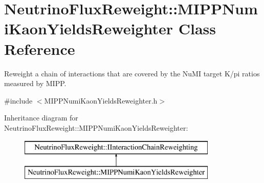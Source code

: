 \hypertarget{class_neutrino_flux_reweight_1_1_m_i_p_p_numi_kaon_yields_reweighter}{\section{Neutrino\-Flux\-Reweight\-:\-:M\-I\-P\-P\-Numi\-Kaon\-Yields\-Reweighter Class Reference}
\label{class_neutrino_flux_reweight_1_1_m_i_p_p_numi_kaon_yields_reweighter}
}


Reweight a chain of interactions that are covered by the Nu\-M\-I target K/pi ratios measured by M\-I\-P\-P.  




{\ttfamily \#include $<$M\-I\-P\-P\-Numi\-Kaon\-Yields\-Reweighter.\-h$>$}

Inheritance diagram for Neutrino\-Flux\-Reweight\-:\-:M\-I\-P\-P\-Numi\-Kaon\-Yields\-Reweighter\-:\begin{figure}[H]
\begin{center}
\leavevmode
\includegraphics[height=2.000000cm]{class_neutrino_flux_reweight_1_1_m_i_p_p_numi_kaon_yields_reweighter}
\end{center}
\end{figure}

